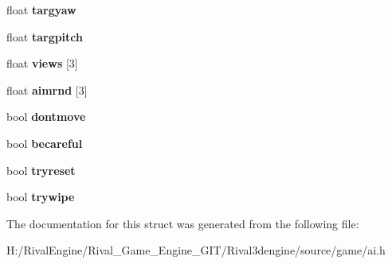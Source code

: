 \begin{DoxyCompactItemize}
float {\bfseries targyaw}
\item 
\mbox{\label{structai_1_1aiinfo_a998f7f65d7344c018658591377228b18}} 
float {\bfseries targpitch}
\item 
\mbox{\label{structai_1_1aiinfo_a5b90f4746991e22825d1b46f00151331}} 
float {\bfseries views} \mbox{[}3\mbox{]}
\item 
\mbox{\label{structai_1_1aiinfo_a9fb0d6ac06995e2f4b94047dba897476}} 
float {\bfseries aimrnd} \mbox{[}3\mbox{]}
\item 
\mbox{\label{structai_1_1aiinfo_acfbadd0930b1a4ef3c7699163206ab0b}} 
bool {\bfseries dontmove}
\item 
\mbox{\label{structai_1_1aiinfo_ab2369b4acfa1c5c1314f6b2a7c78f8d5}} 
bool {\bfseries becareful}
\item 
\mbox{\label{structai_1_1aiinfo_a410950d8337ab633cfc3c0f957e47c29}} 
bool {\bfseries tryreset}
\item 
\mbox{\label{structai_1_1aiinfo_a50ec36010a33c7bf5b0ab9f5b4294493}} 
bool {\bfseries trywipe}
\end{DoxyCompactItemize}


The documentation for this struct was generated from the following file\+:\begin{DoxyCompactItemize}
\item 
H\+:/\+Rival\+Engine/\+Rival\+\_\+\+Game\+\_\+\+Engine\+\_\+\+G\+I\+T/\+Rival3dengine/source/game/ai.\+h\end{DoxyCompactItemize}
